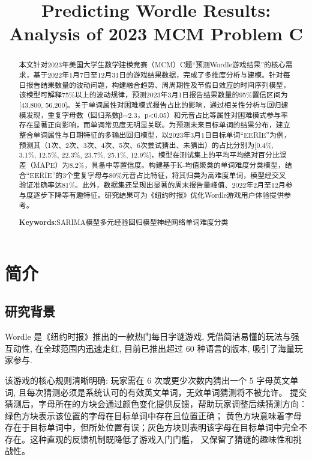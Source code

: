 \documentclass[12pt]{article}  %
\title{Predicting Wordle Results: Analysis of 2023 MCM Problem C}  %
\begin{document}
\begin{abstract}
本文针对2023年美国大学生数学建模竞赛（MCM）C题“预测Wordle游戏结果”的核心需求，基于2022年1月7日至12月31日的游戏结果数据，完成了多维度分析与建模。针对每日报告结果数量的波动问题，构建融合趋势、周周期性及节假日效应的时间序列模型，该模型可解释75\%以上的波动规律，预测2023年3月1日报告结果数量的95\%置信区间为
[43,800, 56,200]。关于单词属性对困难模式报告占比的影响，通过相关性分析与回归建模发现，重复字母数（回归系数β=2.3，p<0.05）和元音占比等属性对困难模式参与率存在显著正向影响，而单词常见度无明显关联。为预测未来目标单词的结果分布，建立整合单词属性与日期特征的多输出回归模型，以2023年3月1日目标单词“EERIE”为例，
预测其（1次、2次、3次、4次、5次、6次尝试猜出、未猜出）的占比分别为[0.4\%, 3.1\%, 12.5\%, 22.3\%, 23.7\%, 25.1\%, 12.9\%]，模型在测试集上的平均平均绝对百分比误差（MAPE）为8.2\%，具备中等置信度。构建基于K-均值聚类的单词难度分类模型，结合“EERIE”的3个重复字母与80\%元音占比特征，将其归类为高难度单词，模型经交叉验证准确率达81\%。此外，数据集还呈现出显著的周末报告量峰值、2022年2月至12月参与度逐步下降等有趣特征。研究结果可为《纽约时报》优化Wordle游戏用户体验提供参考。
    
\vspace{5pt}

    \textbf{Keywords}:SARIMA模型\quad 多元经验回归模型\quad 神经网络\quad 单词难度分类

\end{abstract}

\maketitle  %
\tableofcontents  %


\section{简介}
\subsection{研究背景}
Wordle 是《纽约时报》推出的一款热门每日字谜游戏, 凭借简洁易懂的玩法与强互动性, 在全球范围内迅速走红, 目前已推出超过 60 种语言的版本, 
吸引了海量玩家参与. 

该游戏的核心规则清晰明确: 玩家需在 6 次或更少次数内猜出一个 5 字母英文单词, 且每次猜测必须是系统认可的有效英文单词，无效单词猜测将不被允许。
提交猜测后，字母所在的方块会通过颜色变化提供反馈，帮助玩家调整后续猜测方向：绿色方块表示该位置的字母在目标单词中存在且位置正确；
黄色方块意味着字母存在于目标单词中，但所处位置有误；灰色方块则表明该字母在目标单词中完全不存在。这种直观的反馈机制既降低了游戏入门门槛，
又保留了猜谜的趣味性和挑战性。
\end{document}
